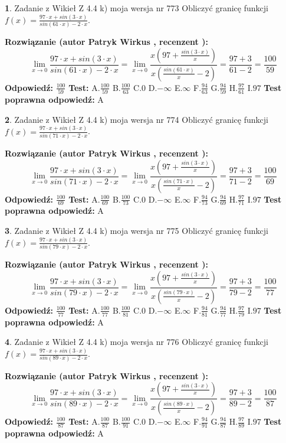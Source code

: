 \documentclass[12pt, a4paper]{article}
\theoremstyle{definition} %
\newtheorem{zad}{}
\newcommand{\zadStart}[1]{\begin{zad}#1\newline}
\newcommand{\zadStop}{\end{zad}}
\newcommand{\rozwStart}[2]{\noindent \textbf{Rozwiązanie (autor #1 , recenzent #2): }\newline}
\newcommand{\rozwStop}{\newline}
\newcommand{\odpStart}{\noindent \textbf{Odpowiedź:}\newline}
\newcommand{\odpStop}{\newline}
\newcommand{\testStart}{\noindent \textbf{Test:}\newline}
\newcommand{\testStop}{\newline}
\newcommand{\kluczStart}{\noindent \textbf{Test poprawna odpowiedź:}\newline}
\newcommand{\kluczStop}{\newline}
\begin{document}
\zadStart{Zadanie z Wikieł Z 4.4 k) moja wersja nr 773}
Obliczyć granicę funkcji $f(x)=\frac{97\cdot x +sin(3\cdot x)}{sin(61\cdot x) -2\cdot x}$.
\zadStop
\rozwStart{Patryk Wirkus}{}
$$\lim\limits_{x\to 0}\frac{97\cdot x +sin(3\cdot x)}{sin(61\cdot x) -2\cdot x}
=\lim\limits_{x\to 0}\frac{x(97+\frac{sin(3\cdot x)}{x})}{x(\frac{sin(61\cdot x)}{x}-2)}
=\frac{97+3}{61-2} = \frac{100}{59}$$
\rozwStop
\odpStart
$\frac{100}{59}$
\odpStop
\testStart
A.$\frac{100}{59}$
B.$\frac{100}{63}$
C.$0$
D.$-\infty$
E.$\infty$
F.$\frac{94}{63}$
G.$\frac{94}{59}$
H.$\frac{97}{61}$
I.$97$
\testStop
\kluczStart
A
\kluczStop



\zadStart{Zadanie z Wikieł Z 4.4 k) moja wersja nr 774}
Obliczyć granicę funkcji $f(x)=\frac{97\cdot x +sin(3\cdot x)}{sin(71\cdot x) -2\cdot x}$.
\zadStop
\rozwStart{Patryk Wirkus}{}
$$\lim\limits_{x\to 0}\frac{97\cdot x +sin(3\cdot x)}{sin(71\cdot x) -2\cdot x}
=\lim\limits_{x\to 0}\frac{x(97+\frac{sin(3\cdot x)}{x})}{x(\frac{sin(71\cdot x)}{x}-2)}
=\frac{97+3}{71-2} = \frac{100}{69}$$
\rozwStop
\odpStart
$\frac{100}{69}$
\odpStop
\testStart
A.$\frac{100}{69}$
B.$\frac{100}{73}$
C.$0$
D.$-\infty$
E.$\infty$
F.$\frac{94}{73}$
G.$\frac{94}{69}$
H.$\frac{97}{71}$
I.$97$
\testStop
\kluczStart
A
\kluczStop



\zadStart{Zadanie z Wikieł Z 4.4 k) moja wersja nr 775}
Obliczyć granicę funkcji $f(x)=\frac{97\cdot x +sin(3\cdot x)}{sin(79\cdot x) -2\cdot x}$.
\zadStop
\rozwStart{Patryk Wirkus}{}
$$\lim\limits_{x\to 0}\frac{97\cdot x +sin(3\cdot x)}{sin(79\cdot x) -2\cdot x}
=\lim\limits_{x\to 0}\frac{x(97+\frac{sin(3\cdot x)}{x})}{x(\frac{sin(79\cdot x)}{x}-2)}
=\frac{97+3}{79-2} = \frac{100}{77}$$
\rozwStop
\odpStart
$\frac{100}{77}$
\odpStop
\testStart
A.$\frac{100}{77}$
B.$\frac{100}{81}$
C.$0$
D.$-\infty$
E.$\infty$
F.$\frac{94}{81}$
G.$\frac{94}{77}$
H.$\frac{97}{79}$
I.$97$
\testStop
\kluczStart
A
\kluczStop



\zadStart{Zadanie z Wikieł Z 4.4 k) moja wersja nr 776}
Obliczyć granicę funkcji $f(x)=\frac{97\cdot x +sin(3\cdot x)}{sin(89\cdot x) -2\cdot x}$.
\zadStop
\rozwStart{Patryk Wirkus}{}
$$\lim\limits_{x\to 0}\frac{97\cdot x +sin(3\cdot x)}{sin(89\cdot x) -2\cdot x}
=\lim\limits_{x\to 0}\frac{x(97+\frac{sin(3\cdot x)}{x})}{x(\frac{sin(89\cdot x)}{x}-2)}
=\frac{97+3}{89-2} = \frac{100}{87}$$
\rozwStop
\odpStart
$\frac{100}{87}$
\odpStop
\testStart
A.$\frac{100}{87}$
B.$\frac{100}{91}$
C.$0$
D.$-\infty$
E.$\infty$
F.$\frac{94}{91}$
G.$\frac{94}{87}$
H.$\frac{97}{89}$
I.$97$
\testStop
\kluczStart
A
\kluczStop
\end{document}
